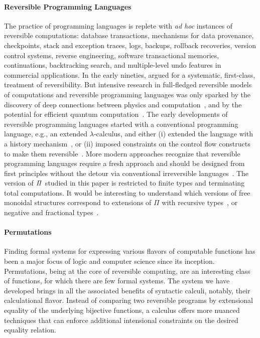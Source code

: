 \paragraph{Reversible Programming Languages} The practice of programming languages is replete with \emph{ad hoc}
instances of reversible computations: database transactions, mechanisms for data provenance, checkpoints, stack and
exception traces, logs, backups, rollback recoveries, version control systems, reverse engineering, software
transactional memories, continuations, backtracking search, and multiple-level undo features in commercial applications.
In the early nineties, \citet{Baker:1992:LLL,Baker:1992:NFT} argued for a systematic, first-class, treatment of
reversibility. But intensive research in full-fledged reversible models of computations and reversible programming
languages was only sparked by the discovery of deep connections between physics and
computation~\cite{Landauer:1961,PhysRevA.32.3266,Toffoli:1980,bennett1985fundamental,Frank:1999:REC:930275,Hey:1999:FCE:304763,fredkin1982conservative},
and by the potential for efficient quantum computation~\cite{springerlink:10.1007/BF02650179}. The early developments of
reversible programming languages started with a conventional programming language, e.g., an extended $\lambda$-calculus,
and either (i) extended the language with a history
mechanism~\cite{vanTonder:2004,Kluge:1999:SEMCD,lorenz,danos2004reversible}, or (ii) imposed constraints on the control
flow constructs to make them reversible~\cite{Yokoyama:2007:RPL:1244381.1244404}.  More modern approaches recognize that
reversible programming languages require a fresh approach and should be designed from first principles without the
detour via conventional irreversible
languages~\cite{Yokoyama:2008:PRP,Mu:2004:ILRC,abramsky2005structural,DiPierro:2006:RCL:1166042.1166047}. The version of
$\mathit{\Pi}$ studied in this paper is restricted to finite types and terminating total computations. It would be
interesting to understand which versions of free monoidal structures correspond to extensions of $\Pi$ with recursive
types~\cite{jamesInformationEffects2012,rc2011}, or negative and fractional
types~\cite*{chenFractionalTypes2020,chenComputationalInterpretationCompact2021}.

\paragraph{Permutations} Finding formal systems for expressing various flavors of computable functions has been a major
focus of logic and computer science since its inception. Permutations, being at the core of reversible computing, are an
interesting class of functions, for which there are few formal systems. The system we have developed brings in all the
associated benefits of syntactic calculi, notably, their calculational flavor. Instead of comparing two reversible
programs by extensional equality of the underlying bijective functions, a calculus offers more nuanced techniques that
can enforce additional intensional constraints on the desired equality relation.


